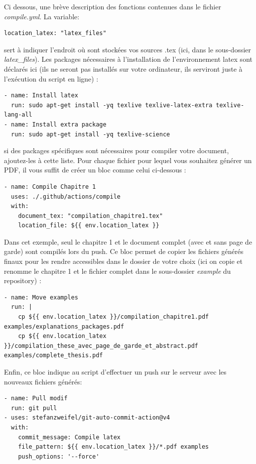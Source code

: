 Ci dessous, une brève description des fonctions contenues dans le fichier \textit{compile.yml}.
La variable:
\begin{lstlisting}
location_latex: "latex_files"
\end{lstlisting}
sert à indiquer l'endroit où sont stockées vos sources .tex (ici, dans le sous-dossier \textit{latex_files}).
Les packages nécessaires à l'installation de l'environnement latex sont déclarés ici (ils ne seront pas installés sur votre ordinateur, ils serviront juste à l'exécution du script en ligne) :
\begin{lstlisting}
- name: Install latex
  run: sudo apt-get install -yq texlive texlive-latex-extra texlive-lang-all
- name: Install extra package
  run: sudo apt-get install -yq texlive-science
\end{lstlisting}
si des packages spécifiques sont nécessaires pour compiler votre document, ajoutez-les à cette liste.
Pour chaque fichier pour lequel vous souhaitez générer un PDF, il vous suffit de créer un bloc comme celui ci-dessous :
\begin{lstlisting}
- name: Compile Chapitre 1
  uses: ./.github/actions/compile
  with:
    document_tex: "compilation_chapitre1.tex"
    location_file: ${{ env.location_latex }}
\end{lstlisting}
Dans cet exemple, seul le chapitre 1 et le document complet (avec et sans page de garde) sont compilés lors du push.
Ce bloc permet de copier les fichiers générés finaux pour les rendre accessibles dans le dossier de votre choix (ici on copie et renomme le chapitre 1 et le fichier complet dans le sous-dossier \textit{example} du repository) :
\begin{lstlisting}
- name: Move examples
  run: |
    cp ${{ env.location_latex }}/compilation_chapitre1.pdf examples/explanations_packages.pdf
    cp ${{ env.location_latex }}/compilation_these_avec_page_de_garde_et_abstract.pdf examples/complete_thesis.pdf
\end{lstlisting}
Enfin, ce bloc indique au script d'effectuer un push sur le serveur avec les nouveaux fichiers générés:
\begin{lstlisting}
- name: Pull modif
  run: git pull
- uses: stefanzweifel/git-auto-commit-action@v4
  with:
    commit_message: Compile latex
    file_pattern: ${{ env.location_latex }}/*.pdf examples
    push_options: '--force'
\end{lstlisting}
